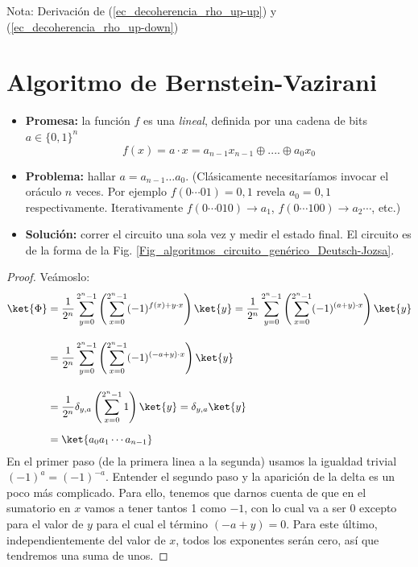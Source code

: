 \documentclass[a4paper,11pt]{book} %
\numberwithin{equation}{chapter}
\def\lp{\left(}
\def\rp{\right)}
\begin{document}
\begin{mybox_blue}{Nota: Derivación de (\ref{ec_decoherencia_rho_up-up}) y  (\ref{ec_decoherencia_rho_up-down})}
	\section{Algoritmo de Bernstein-Vazirani}
		
\begin{itemize}
	\item \textbf{Promesa:} la función $f$ es una \textit{lineal}, definida por una cadena de bits $a \in \{0,1\}^n$
		\begin{equation*}
		f(x) = a\cdot x  = a_{n-1} x_{n-1} \oplus ....\oplus a_0 x_0
		\end{equation*}

	
	\item \textbf{Problema:} hallar $a = a_{n-1} \ldots a_0$. (Clásicamente necesitaríamos invocar el oráculo  $n$ veces. Por ejemplo  $f(0\cdots 0 1)=0,1 $ revela $a_0=0,1$ respectivamente. Iterativamente  $f(0\cdots 0 1 0)\to a_1$, $ f(0\cdots 1 0 0)\to a_2 \cdots$, etc.)
	
	\item \textbf{Solución:} correr el circuito una sola vez y medir el estado final. 	El circuito es de la forma de la Fig. \ref{Fig_algoritmos_circuito_genérico_Deutsch-Jozsa}.
\end{itemize}

	\begin{proof}
	Veámoslo:
	\begin{align*}
	\ket{\Phi} & = \frac{1}{2^n}\sum_{y=0}^{2^n-1} \left(\sum_{x=0}^{2^n-1}(-1)^{f(x)+ y\cdot x}\right)\ket{y} = \frac{1}{2^n}\sum_{y=0}^{2^n-1} \left(\sum_{x=0}^{2^n-1}(-1)^{(a+y)\cdot x}\right)\ket{y} \\  \rule{0mm}{10mm}
	& =  \frac{1}{2^n}\sum_{y=0}^{2^n-1} \left(\sum_{x=0}^{2^n-1}(-1)^{(-a+y)\cdot x}\right)\ket{y} \\ \rule{0mm}{10mm}
	& =  \frac{1}{2^n} \delta_{y,a} \lp \sum_{x=0}^{2^n-1} 1 \rp \ket{y} = \delta_{y,a} \ket{y} \\  \rule{0mm}{5mm} 
    & =  \ket{a_0a_1\cdots a_{n-1}}
	\end{align*}
	En el primer paso (de la primera linea a la segunda) usamos la igualdad trivial $ (-1)^a = (-1)^{-a}$. Entender el segundo paso y la aparición de la  delta es un poco más complicado. Para ello, tenemos que darnos cuenta de que en el sumatorio en $x$ vamos a tener tantos 1 como $-1$, con lo cual va a ser $0$ excepto para el valor de $y$ para el cual el término $(-a+y) = 0$. Para este último, independientemente del valor de $x$, todos los exponentes serán cero, así que tendremos una suma de unos.
	\end{proof}


\end{mybox_blue}
\end{document}
